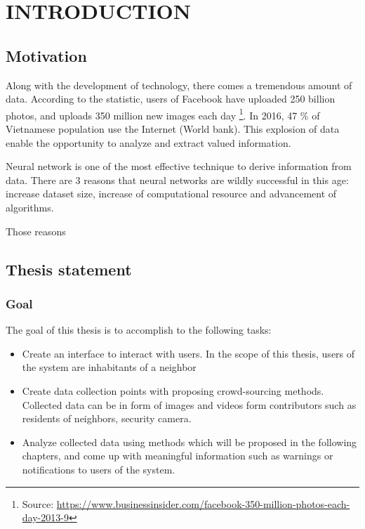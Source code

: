 \chapter{INTRODUCTION}
\label{introduction}
\section{Motivation}
Along with the development of technology, there comes a tremendous amount of data. According to the statistic, users of Facebook have uploaded 250 billion photos, and uploads 350 million new images each day \footnote{Source: \url{https://www.businessinsider.com/facebook-350-million-photos-each-day-2013-9}}. In 2016, 47 \% of Vietnamese population use the Internet (World bank). This explosion of data enable the opportunity to analyze and extract valued information.

Neural network is one of the most effective technique to derive information from data. There are 3 reasons that neural networks are wildly successful in this age: increase dataset size, increase of computational resource and advancement of algorithms.

Those reasons 
 
\section{Thesis statement}
\subsection{Goal}
The goal of this thesis is to accomplish to the following tasks:
\begin{itemize}
	\item Create an interface to interact with users. In the scope of this thesis, users of the system are inhabitants of a neighbor
	\item Create data collection points with proposing crowd-sourcing methods. Collected data can be in form of images and videos form contributors such as residents of neighbors, security camera.
	\item Analyze collected data using methods which will be proposed in the following chapters, and come up with meaningful information such as warnings or notifications to users of the system.
\end{itemize} 


